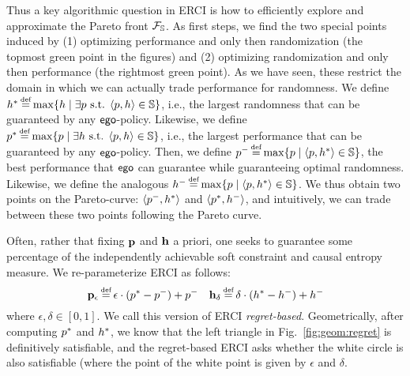 Thus a key algorithmic question in ERCI is how to efficiently explore
and approximate the Pareto front $\mathcal{F}_{\mathbb{S}}$. As first steps, we find the two special points induced by (1) optimizing performance and only then randomization (the topmost green point in the figures) and (2) optimizing randomization and only then performance (the rightmost green point). 
As we have seen, these restrict the domain in which we can actually trade performance for randomness. 
We define 
$\rndopt \eqdef \max \{ \rndp \mid \exists \scp \text{ s.t. } \langle \scp, \rndp \rangle \in \solutions  \} $, i.e., the largest randomness that can be guaranteed by any $\mathsf{ego}$-policy. 
Likewise, we define 
$\scopt \eqdef \max \{ \scp \mid \exists \rndp \text{ s.t. } \langle \scp, \rndp \rangle \in \solutions  \} $, i.e., the largest performance that can be guaranteed by any $\mathsf{ego}$-policy. 
Then, we define 
$\scmin \eqdef \max \{ \scp \mid \langle \scp, \rndopt \rangle  \in \solutions \}$, the best performance that $\mathsf{ego}$ can guarantee while guaranteeing optimal randomness. 
Likewise, we define  the analogous $\rndmin \eqdef \max \{ \scp \mid \langle \scp, \rndopt \rangle  \in \solutions \}$.
We thus obtain two points on the Pareto-curve: $\langle p^{-}, h^{*} \rangle$ and $\langle p^{*}, h^{-} \rangle$, and intuitively, we can trade between these two points following the Pareto curve.


Often, rather that fixing $\mathbf{p}$ and $\mathbf{h}$ a
  priori, one seeks to guarantee some percentage of the independently achievable soft
  constraint and causal entropy measure.  We
  re-parameterize ERCI as follows:
  \begin{equation}
    \scthreshold_\epsilon \eqdef \epsilon \cdot (\scopt - \scmin) + \scmin
    \hspace{1em}
    \randomness_\delta \eqdef  \delta \cdot (\rndopt - \rndmin) + \rndmin
  \end{equation}
  where $\epsilon, \delta \in [0, 1]$. We call this version of ERCI \emph{regret-based}. Geometrically, after computing $p^{*}$ and $h^{*}$, we know that the left triangle in Fig.~\ref{fig:geom:regret} is definitively satisfiable, and the regret-based ERCI asks whether the white circle is also satisfiable (where the point of the white point is given by $\epsilon$ and $\delta$. %


